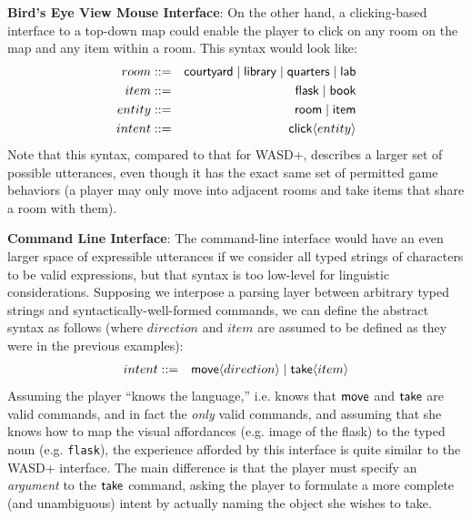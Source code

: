   \textbf{Bird's Eye View Mouse Interface}:
  On the other hand, a clicking-based interface to a top-down map could
  enable the player to click on any room on the map and any item within a
  room. This syntax would look like:
  \begin{eqnarray*}
    room   &::=& \mathsf{courtyard} \mid \mathsf{library} \mid \mathsf{quarters}
              \mid \mathsf{lab}\\
    item   &::=& \mathsf{flask} \mid \mathsf{book}\\
    entity &::=& \mathsf{room} \mid \mathsf{item}\\
    intent &::=& \mathsf{click}\langle entity \rangle
  \end{eqnarray*}
  Note that this syntax, compared to that for WASD+, describes a larger set
  of possible utterances, even though it has the exact same set of
  permitted game behaviors (a player may only move into adjacent rooms and
  take items that share a room with them). 


  \textbf{Command Line Interface}:
  The command-line interface would have an even larger space of expressible
  utterances if we consider all typed strings of characters to be valid
  expressions, but that syntax is too low-level for linguistic
  considerations. Supposing we interpose a parsing layer between arbitrary
  typed strings and syntactically-well-formed commands, we can define the
  abstract syntax as follows (where $direction$ and $item$ are assumed to
  be defined as they were in the previous examples):
%
  \begin{eqnarray*}
    intent &::=& \mathsf{move}\langle direction \rangle \mid \mathsf{take}\langle item \rangle
  \end{eqnarray*}
%
  Assuming the player ``knows the language,'' i.e. knows that $\mathsf{move}$
  and $\mathsf{take}$ are valid commands, and in fact the {\em only} valid
  commands, and assuming that she knows how to map the visual affordances
  (e.g. image of the flask) to the typed noun (e.g. \verb|flask|), the
  experience afforded by this interface is quite similar to the WASD+
  interface. The main difference is that the player must specify an {\em
  argument} to the $\mathsf{take}$ command, asking the player to formulate a
  more complete (and unambiguous) intent by actually naming the object she
  wishes to take.

